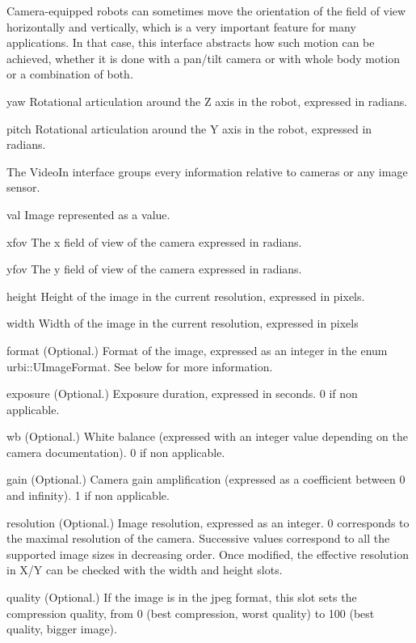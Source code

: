 
Camera-equipped robots can sometimes move the orientation of the field of
view horizontally and vertically, which is a very important feature for many
applications. In that case, this interface abstracts how such motion can be
achieved, whether it is done with a pan/tilt camera or with whole body
motion or a combination of both.

\begin{urbiscriptapi}
\item[yaw] Rotational articulation around the Z axis in the robot, expressed
  in radians.
\item[pitch] Rotational articulation around the Y axis in the robot,
  expressed in radians.
\end{urbiscriptapi}


The VideoIn interface groups every information relative to cameras or any
image sensor.

\begin{urbiscriptapi}
\item[val] Image represented as a  value.
\item[xfov] The x field of view of the camera expressed in radians.
\item[yfov] The y field of view of the camera expressed in radians.

\item[height] Height of the image in the current resolution, expressed in
  pixels.

\item[width] Width of the image in the current resolution, expressed in
  pixels

\item[format] (Optional.)  Format of the image, expressed as an integer in the enum
  urbi::UImageFormat.  See below for more information.

\item[exposure] (Optional.) Exposure duration, expressed in seconds. 0 if non
  applicable.

\item[wb] (Optional.)  White balance (expressed with an integer value depending on the
  camera documentation). 0 if non applicable.

\item[gain] (Optional.)  Camera gain amplification (expressed as a coefficient between
  0 and infinity). 1 if non applicable.

\item[resolution] (Optional.)  Image resolution, expressed as an integer. 0 corresponds
  to the maximal resolution of the camera. Successive values correspond to
  all the supported image sizes in decreasing order.  Once modified, the
  effective resolution in X/Y can be checked with the width and height
  slots.

\item[quality] (Optional.)  If the image is in the jpeg format, this slot sets the
  compression quality, from 0 (best compression, worst quality) to 100 (best
  quality, bigger image).
\end{urbiscriptapi}

